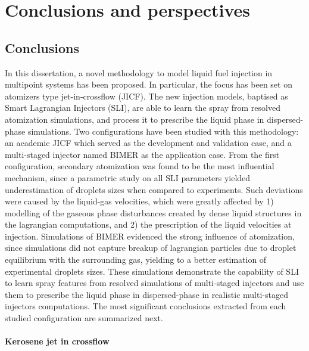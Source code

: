 \chapter{Conclusions and perspectives}

\section*{Conclusions}

In this dissertation, a novel methodology to model liquid fuel injection in multipoint systems has been proposed. In particular, the focus has been set on atomizers type jet-in-crossflow (JICF). The new injection models, baptised as Smart Lagrangian Injectors (SLI), are able to learn the spray from resolved atomization simulations, and process it to prescribe the liquid phase in dispersed-phase simulations. Two configurations have been studied with this methodology: an academic JICF which served as the development and validation case, and a multi-staged injector named BIMER as the application case. From the first configuration, secondary atomization was found to be the most influential mechanism, since a parametric study on all SLI parameters yielded underestimation of droplets sizes when compared to experiments. Such deviations were caused by the liquid-gas velocities, which were greatly affected by 1) modelling of the gaseous phase disturbances created by dense liquid structures in the lagrangian computations, and 2) the prescription of the liquid velocities at injection. Simulations of BIMER evidenced the strong influence of atomization, since simulations did not capture breakup of lagrangian particles due to droplet equilibrium with the surrounding gas, yielding to a better estimation of experimental droplets sizes. These simulations demonstrate the capability of SLI to learn spray features from resolved simulations of multi-staged injectors and use them to prescribe the liquid phase in dispersed-phase in realistic multi-staged injectors computations. The most significant conclusions extracted from each studied configuration are summarized next.


\subsubsection*{Kerosene jet in crossflow}

